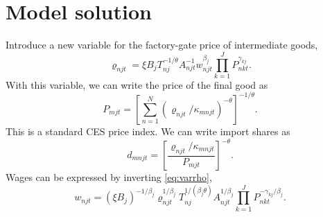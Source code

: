 \documentclass[12pt]{article}
\begin{document}
\section{Model solution}
Introduce a new variable for the factory-gate price of intermediate goods,
\begin{equation}\label{eq:varrho}
	\varrho_{njt} = \xi B_j T_{nj}^{-1/\theta} A_{njt}^{-1} w_{njt}^{\beta_j} \prod_{k=1}^J P_{nkt}^{\gamma_{kj}}.
\end{equation}
With this variable, we can write the price of the final good as
\begin{equation}\label{eq:price}
	P_{mjt} = \left[
		\sum_{n=1}^N (\varrho_{njt}/\kappa_{mnjt})^{-\theta}
		\right]^{-1/\theta}.
\end{equation}
This is a standard CES price index. We can write import shares as
\begin{equation}\label{eq:import_share}
	d_{mnjt} = \left[
	\frac
	{\varrho_{njt}/\kappa_{mnjt}}
	{P_{mjt}}
	\right]^{-\theta}.
\end{equation}
Wages can be expressed by inverting \eqref{eq:varrho},
\begin{equation}\label{eq:wage}
	w_{njt} = (\xi B_j)^{-1/\beta_j}
	\varrho_{njt}^{1/\beta_j}  
	T_{nj}^{1/(\beta_j\theta)}A_{njt}^{1/\beta_j} 
	\prod_{k=1}^J P_{nkt}^{-\gamma_{kj}/\beta_j}.
\end{equation}
\end{document}
